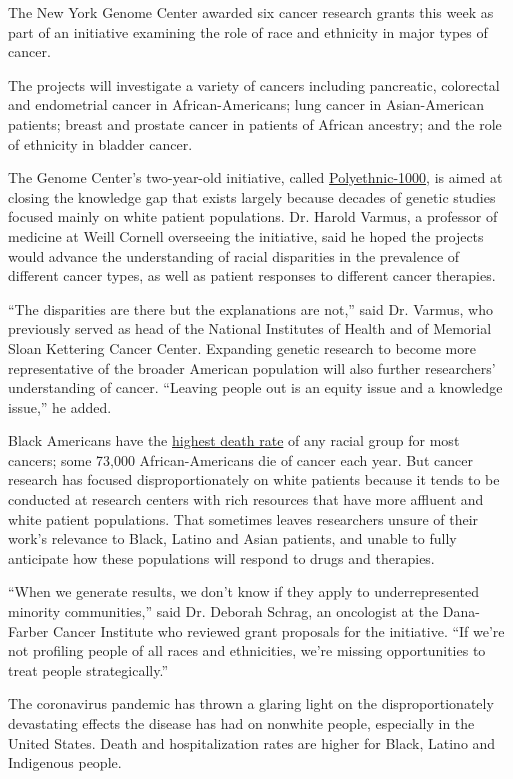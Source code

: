 The New York Genome Center awarded six cancer research grants this week
as part of an initiative examining the role of race and ethnicity in
major types of cancer.

The projects will investigate a variety of cancers including pancreatic,
colorectal and endometrial cancer in African-Americans; lung cancer in
Asian-American patients; breast and prostate cancer in patients of
African ancestry; and the role of ethnicity in bladder cancer.

The Genome Center's two-year-old initiative, called
\href{https://www.nygenome.org/research-areas/cancer/polyethnic-1000/}{Polyethnic-1000},
is aimed at closing the knowledge gap that exists largely because
decades of genetic studies focused mainly on white patient populations.
Dr. Harold Varmus, a professor of medicine at Weill Cornell overseeing
the initiative, said he hoped the projects would advance the
understanding of racial disparities in the prevalence of different
cancer types, as well as patient responses to different cancer
therapies.

``The disparities are there but the explanations are not,'' said Dr.
Varmus, who previously served as head of the National Institutes of
Health and of Memorial Sloan Kettering Cancer Center. Expanding genetic
research to become more representative of the broader American
population will also further researchers' understanding of cancer.
``Leaving people out is an equity issue and a knowledge issue,'' he
added.

Black Americans have the
\href{https://pubmed.ncbi.nlm.nih.gov/30762872/}{highest death rate} of
any racial group for most cancers; some 73,000 African-Americans die of
cancer each year. But cancer research has focused disproportionately on
white patients because it tends to be conducted at research centers with
rich resources that have more affluent and white patient populations.
That sometimes leaves researchers unsure of their work's relevance to
Black, Latino and Asian patients, and unable to fully anticipate how
these populations will respond to drugs and therapies.

``When we generate results, we don't know if they apply to
underrepresented minority communities,'' said Dr. Deborah Schrag, an
oncologist at the Dana-Farber Cancer Institute who reviewed grant
proposals for the initiative. ``If we're not profiling people of all
races and ethnicities, we're missing opportunities to treat people
strategically.''

The coronavirus pandemic has thrown a glaring light on the
disproportionately devastating effects the disease has had on nonwhite
people, especially in the United States. Death and hospitalization rates
are higher for Black, Latino and Indigenous people.


